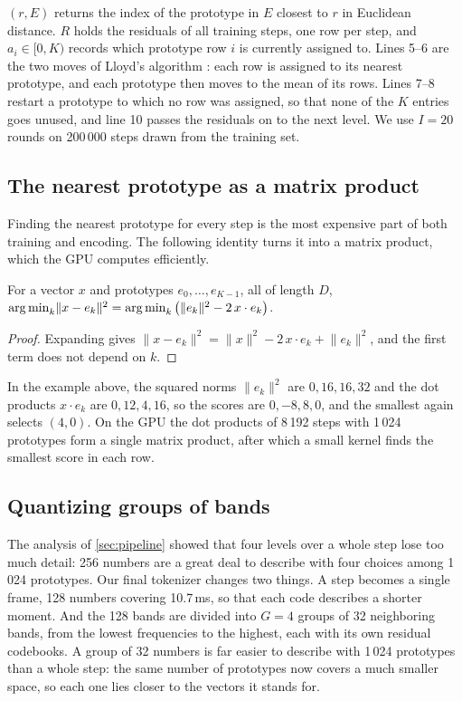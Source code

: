 $(r, E)$ returns the index of the prototype in $E$ closest to
$r$ in Euclidean distance. $R$ holds the residuals of all training steps, one
row per step, and $a_i \in [0, K)$ records which prototype row $i$ is currently
assigned to. Lines 5--6 are the two moves of Lloyd's algorithm \cite{lloyd1982least}:
each row is assigned to its nearest prototype, and each prototype then moves
to the mean of its rows. Lines 7--8 restart a prototype to which no row was
assigned, so that none of the $K$ entries goes unused, and line 10 passes the
residuals on to the next level. We use $I = 20$ rounds on 200\,000 steps drawn
from the training set.

\subsection{The nearest prototype as a matrix product}

Finding the nearest prototype for every step is the most expensive part of
both training and encoding. The following identity turns it into a matrix
product, which the GPU computes efficiently.

\begin{lemma}
For a vector $x$ and prototypes $e_0, \dots, e_{K-1}$, all of length $D$,
$\operatorname*{arg\,min}_k \lVert x - e_k \rVert^2 = \operatorname*{arg\,min}_k \big(\lVert e_k \rVert^2 - 2\,x \cdot e_k\big)$.
\end{lemma}
\begin{proof}
Expanding gives $\lVert x - e_k \rVert^2 = \lVert x \rVert^2 - 2\,x \cdot e_k + \lVert e_k \rVert^2$,
and the first term does not depend on $k$.
\end{proof}

In the example above, the squared norms $\lVert e_k \rVert^2$ are $0, 16, 16, 32$
and the dot products $x \cdot e_k$ are $0, 12, 4, 16$, so the scores are
$0, -8, 8, 0$, and the smallest again selects $(4, 0)$. On the GPU the dot
products of 8\,192 steps with 1\,024 prototypes form a single matrix product,
after which a small kernel finds the smallest score in each row.

\subsection{Quantizing groups of bands}
\label{sec:band-groups}

The analysis of \cref{sec:pipeline} showed that four levels over a whole step
lose too much detail: 256 numbers are a great deal to describe with four
choices among 1\,024 prototypes. Our final tokenizer changes two things. A step
becomes a single frame, 128 numbers covering 10.7\,ms, so that each code
describes a shorter moment. And the 128 bands are divided into $G = 4$ groups
of 32 neighboring bands, from the lowest frequencies to the highest, each with
its own residual codebooks. A group of 32 numbers is far easier to describe
with 1\,024 prototypes than a whole step: the same number of prototypes now
covers a much smaller space, so each one lies closer to the vectors it stands
for.

